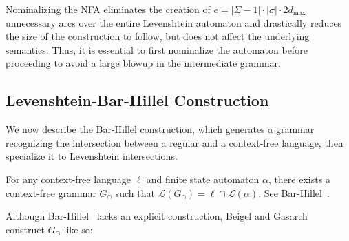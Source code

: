 \documentclass[sigplan,review,anonymous,acmsmall]{acmart}\settopmatter{printfolios=false,printccs=false,printacmref=false}
\begin{document}

  Nominalizing the NFA eliminates the creation of $e=|\Sigma - 1|\cdot|\sigma|\cdot2d_\max$ unnecessary arcs over the entire Levenshtein automaton and drastically reduces the size of the construction to follow, but does not affect the underlying semantics. Thus, it is essential to first nominalize the automaton before proceeding to avoid a large blowup in the intermediate grammar.

  \subsection{Levenshtein-Bar-Hillel Construction}\label{sec:lev_bh}

  We now describe the Bar-Hillel construction, which generates a grammar recognizing the intersection between a regular and a context-free language, then specialize it to Levenshtein intersections.

  \begin{lemma}\label{lemma:bar-hillel}
  For any context-free language $\ell$ and finite state automaton $\alpha$, there exists a context-free grammar $G_\cap$ such that $\mathcal{L}(G_\cap) = \ell \cap \mathcal{L}(\alpha)$. See Bar-Hillel~\cite{bar1961formal}.
  \end{lemma}

  \noindent Although Bar-Hillel~\cite{bar1961formal} lacks an explicit construction, Beigel and Gasarch~\cite{beigelproof} construct $G_\cap$ like so:
\end{document}
